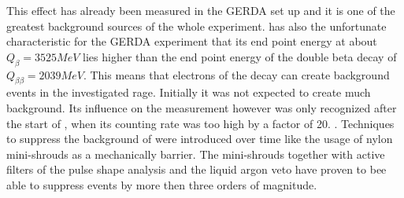 \documentclass[encoding=utf8,british]{tumphthesis}
\begin{document}
This effect has already been measured in the GERDA set up and it is one of the greatest background sources of the whole experiment.
 has also the unfortunate characteristic for the GERDA experiment that its end point energy at about $Q_{\beta}=3525\unit{MeV}$ lies higher than the end point energy of the double beta decay of  $Q_{\beta \beta} = 2039\unit{MeV}$.
This means that electrons of the  decay can create background events in the investigated rage. 
Initially it was not expected to create much background.
Its influence on the measurement however was only recognized after the start of \PI, when its counting rate was too high by a factor of 20. \cite{becerici_schmidt_results_2014}. %
Techniques to suppress the background of  were introduced over time like the usage of nylon mini-shrouds as a mechanically barrier.
The mini-shrouds together with active filters of the pulse shape analysis and the liquid argon veto have proven to bee able to suppress  events by more then three orders of magnitude.
\\
\end{document}
